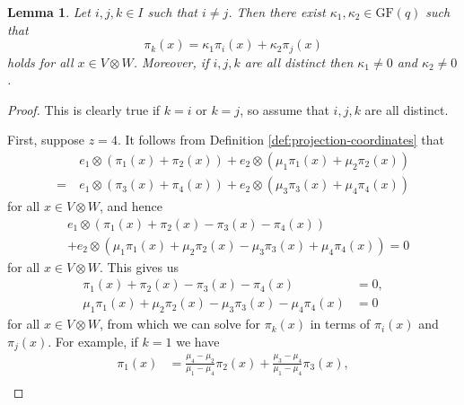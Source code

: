 \documentclass[10pt]{amsart}
\theoremstyle{definition}
\theoremstyle{plain}
\newtheorem{lemma}[lemma]{Lemma}
\theoremstyle{plain}
\theoremstyle{plain}
\theoremstyle{plain}
\newcommand{\GF}{\mathrm{GF}}
\begin{document}
\begin{lemma} \label{lm:projection-relations}
Let $i, j, k \in I$ such that $i \neq j$. Then there exist $\kappa_1, \kappa_2 \in \GF{\left(q \right)}$ such that
\begin{displaymath}
    \pi_k{\left(x \right)} = \kappa_1 \pi_i{\left(x \right)} + \kappa_2 \pi_j{\left(x \right)}
\end{displaymath}
holds for all $x \in V \otimes W$. Moreover, if $i, j, k$ are all distinct then $\kappa_1 \neq 0$ and $\kappa_2 \neq 0$.
\end{lemma}
\begin{proof}
This is clearly true if $k=i$ or $k=j$, so assume that $i, j, k$ are all distinct.

First, suppose $z=4$. It follows from Definition \ref{def:projection-coordinates} that
\begin{align*}
    &e_1 \otimes \left(\pi_1{\left(x \right)} + \pi_2{\left(x \right)}\right) + e_2 \otimes \left(\mu_1 \pi_1{\left(x \right)} + \mu_2 \pi_2{\left(x \right)}\right) \\
    =\ &e_1 \otimes \left(\pi_3{\left(x \right)} + \pi_4{\left(x \right)}\right) + e_2 \otimes \left(\mu_3 \pi_3{\left(x \right)} + \mu_4 \pi_4{\left(x \right)}\right)
\end{align*}
for all $x \in V \otimes W$, and hence
\begin{align*}
    &e_1 \otimes \left(\pi_1{\left(x \right)} + \pi_2{\left(x \right)} - \pi_3{\left(x \right)} - \pi_4{\left(x \right)}\right) \\ 
    &+ e_2 \otimes \left(\mu_1 \pi_1{\left(x \right)} + \mu_2 \pi_2{\left(x \right)} - \mu_3 \pi_3{\left(x \right)} + \mu_4 \pi_4{\left(x \right)}\right) = 0
\end{align*}
for all $x \in V \otimes W$.
This gives us
\begin{align}
    \pi_1{\left(x \right)} + \pi_2{\left(x \right)} - \pi_3{\left(x \right)} - \pi_4{\left(x \right)} &= 0, \label{eqn:projection-relation-unsolved-1} \\
    \mu_1 \pi_1{\left(x \right)} + \mu_2 \pi_2{\left(x \right)} - \mu_3 \pi_3{\left(x \right)} - \mu_4 \pi_4{\left(x \right)} &= 0 \label{eqn:projection-relation-unsolved-2}
\end{align}
for all $x \in V \otimes W$, from which we can solve for $\pi_k{\left(x \right)}$ in terms of $\pi_i{\left(x \right)}$ and $\pi_j{\left(x \right)}$. For example, if $k=1$ we have
\begin{align*}
    \pi_1{\left(x \right)} &= \frac{\mu_4 - \mu_2}{\mu_1 - \mu_4} \pi_2{\left(x \right)} + \frac{\mu_3 - \mu_4}{\mu_1 - \mu_4} \pi_3{\left(x \right)}, \\

\end{align*}
\end{proof}
\end{document}
